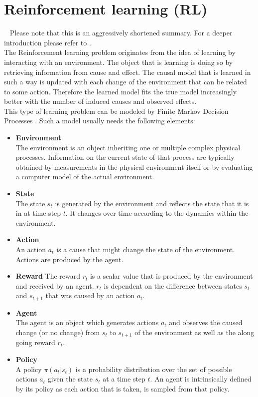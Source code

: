 \section{Reinforcement learning (RL)}~\label{ssec:rl}
\noindent Please note that this is an aggressively shortened summary. For a deeper introduction please refer to \cite{SB_all}.\\
The Reinforcement learning problem originates from the idea of learning by interacting with an environment. The object that is learning is doing so by retrieving information from cause and effect. The causal model that is learned in such a way is updated with each change of the environment that can be related to some action. Therefore the learned model fits the true model increasingly better with the number of induced causes and observed effects.\\
This type of learning problem can be modeled by Finite Markov Decision Processes \cite{wikimdp}. Such a model usually needs the following elements:\\

\begin{itemize}
	\item \textbf{Environment}\\
	The environment is an object inheriting one or multiple complex physical processes. Information on the current state of that process are typically obtained by measurements in the physical environment itself or by evaluating a computer model of the actual environment.
	\item \textbf{State}\\
	The state $s_t$ is generated by the environment and reflects the state that it is in at time step $t$. It changes over time according to the dynamics within the environment.
	\item \textbf{Action}\\
	An action $a_t$ is a cause that might change the state of the environment. Actions are produced by the agent.
	\item \textbf{Reward} The reward $r_t$ is a scalar value that is produced by the environment and received by an agent. $r_t$ is dependent on the difference between states $s_t$ and $s_{t+1}$ that was caused by an action $a_t$.
	\item \textbf{Agent}\\
	The agent is an object which generates actions $a_t$ and observes the caused change (or no change) from $s_t$ to $s_{t+1}$ of the environment as well as the along going reward $r_t$.
	\item \textbf{Policy}\\
	A policy $\pi(a_t|s_t)$ is a probability distribution over the set of possible actions $a_t$ given the state $s_t$ at a time step $t$. An agent is intrinsically defined by its policy as each action that is taken, is sampled from that policy.
\end{itemize}


